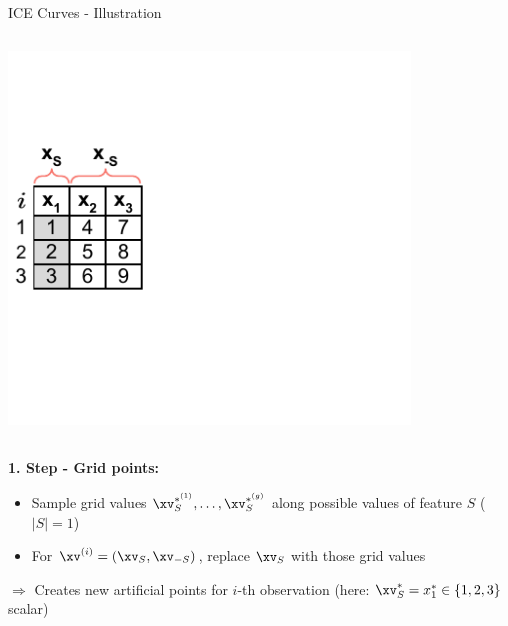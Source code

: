 \documentclass[10pt,compress,t,notes=noshow, xcolor=table]{beamer}
\begin{document}
\begin{frame}{ICE Curves - Illustration}

\begin{columns}[c, totalwidth=\textwidth]
\begin{column}{0.4\textwidth}
\includegraphics[page=2, trim=0cm 0.35cm 0.85cm 0.35cm, width=0.9\textwidth]{../../figure_man/ice_plot_demo}
\end{column}
\begin{column}{0.55\textwidth}

\end{column}
\end{columns}
\vspace*{\topsep}

\textbf{1. Step - Grid points:}

\begin{itemize}
    \item Sample grid values $\xv_S^{*^{(1)}}, \dots, \xv_S^{*^{(g)}}$ along possible values of feature $S$ ($|S| = 1$)
\item For $\xv^{(i)} = (\xv_S, \xv_{-S})$, replace  $\xv_S$ with those grid values
\end{itemize}
$\Rightarrow$ Creates new artificial points for $i$-th observation (here: $\xv_S^* = x_1^* \in \{1, 2, 3\}$ scalar)

\end{frame}
\end{document}
